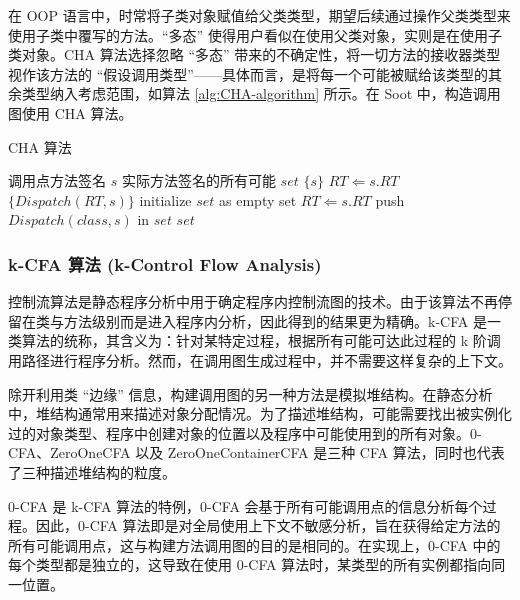 在 OOP 语言中，时常将子类对象赋值给父类类型，期望后续通过操作父类类型来使用子类中覆写的方法。“多态” 使得用户看似在使用父类对象，实则是在使用子类对象。CHA 算法选择忽略 “多态” 带来的不确定性，将一切方法的接收器类型视作该方法的 “假设调用类型”——具体而言，是将每一个可能被赋给该类型的其余类型纳入考虑范围，如算法 \ref{alg:CHA-algorithm} 所示。在 Soot 中，构造调用图使用 CHA 算法。

\vskip 13.8pt
\renewcommand{\thealgorithm}{6}
    \begin{algorithm}
        \caption{CHA 算法}
        \begin{algorithmic}[1]
            \Require 调用点方法签名 $s$
            \Ensure 实际方法签名的所有可能 $set$
                \State \Return $\{s\}$
                \State $RT \Leftarrow s.RT$
                \State \Return $\{Dispatch(RT, s)\}$
            \Else
                \State initialize $set$ as empty set
                \State $RT \Leftarrow s.RT$
                    \State push $Dispatch(class, s)$ in $set$
                \EndFor
                \State \Return $set$
            \EndIf
        \end{algorithmic}
        \label{alg:CHA-algorithm}
    \end{algorithm}
    \vskip 13.8pt

\subsubsection{k-CFA 算法 (k-Control Flow Analysis)}

控制流算法是静态程序分析中用于确定程序内控制流图的技术。由于该算法不再停留在类与方法级别而是进入程序内分析，因此得到的结果更为精确。k-CFA 是一类算法的统称，其含义为：针对某特定过程，根据所有可能可达此过程的 k 阶调用路径进行程序分析\cite{FLOWSENSITIVECONTROLFLOWANALYSIS}。然而，在调用图生成过程中，并不需要这样复杂的上下文。

除开利用类 “边缘” 信息，构建调用图的另一种方法是模拟堆结构。在静态分析中，堆结构通常用来描述对象分配情况。为了描述堆结构，可能需要找出被实例化过的对象类型、程序中创建对象的位置以及程序中可能使用到的所有对象。0-CFA、ZeroOneCFA 以及 ZeroOneContainerCFA 是三种 CFA 算法，同时也代表了三种描述堆结构的粒度。

0-CFA 是 k-CFA 算法的特例，0-CFA 会基于所有可能调用点的信息分析每个过程。因此，0-CFA 算法即是对全局使用上下文不敏感分析，旨在获得给定方法的所有可能调用点，这与构建方法调用图的目的是相同的。在实现上，0-CFA 中的每个类型都是独立的，这导致在使用 0-CFA 算法时，某类型的所有实例都指向同一位置。

